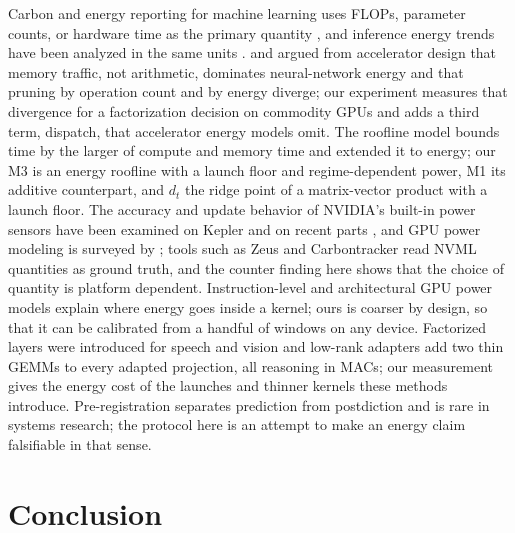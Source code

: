 \documentclass{article}
\begin{document}
Carbon and energy reporting for machine learning uses FLOPs, parameter counts, or hardware time as the primary quantity \cite{strubell2019energy,henderson2020systematic,schwartz2020green,patterson2021carbon,lacoste2019quantifying,luccioni2023bloom}, and inference energy trends have been analyzed in the same units \cite{desislavov2023trends}. \citet{sze2017efficient} and \citet{yang2017energy} argued from accelerator design that memory traffic, not arithmetic, dominates neural-network energy and that pruning by operation count and by energy diverge; our experiment measures that divergence for a factorization decision on commodity GPUs and adds a third term, dispatch, that accelerator energy models omit. The roofline model \cite{williams2009roofline} bounds time by the larger of compute and memory time and \citet{choi2013roofline} extended it to energy; our M3 is an energy roofline with a launch floor and regime-dependent power, M1 its additive counterpart, and $d_t$ the ridge point of a matrix-vector product with a launch floor. The accuracy and update behavior of NVIDIA's built-in power sensors have been examined on Kepler \cite{burtscher2014measuring} and on recent parts \cite{yang2023parttime,yang2024accurate}, and GPU power modeling is surveyed by \citet{bridges2016understanding}; tools such as Zeus \cite{you2023zeus} and Carbontracker \cite{anthony2020carbontracker} read NVML quantities as ground truth, and the counter finding here shows that the choice of quantity is platform dependent. Instruction-level and architectural GPU power models \cite{arafa2020verified,kandiah2021accelwattch} explain where energy goes inside a kernel; ours is coarser by design, so that it can be calibrated from a handful of windows on any device. Factorized layers were introduced for speech \cite{sainath2013lowrank} and vision \cite{denton2014exploiting,jaderberg2014speeding} and low-rank adapters \cite{hu2022lora} add two thin GEMMs to every adapted projection, all reasoning in MACs; our measurement gives the energy cost of the launches and thinner kernels these methods introduce. Pre-registration separates prediction from postdiction \cite{nosek2018preregistration} and is rare in systems research; the protocol here is an attempt to make an energy claim falsifiable in that sense.

\section{Conclusion}
\label{sec:conclusion}
\end{document}
